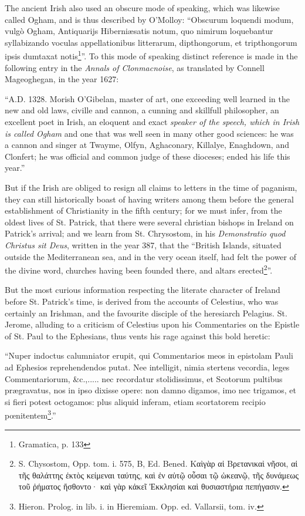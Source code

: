 \documentclass[11pt,oneside]{memoir}
\begin{document}
The ancient Irish also used an obscure mode of speaking, which was likewise called Ogham, and is thus described by O'Molloy: ``Obscurum loquendi modum, vulg\`o \gaelicfont Ogham\normalfont, Antiquarijs Hiberni\ae satis notum, quo nimirum loquebantur syllabizando voculas appellationibus litterarum, dipthongorum, et tripthongorum ipsis dumtaxat notis\footnote{Gramatica, p. 133}''.
To this mode of speaking distinct reference is made in the following entry in the \textit{Annals of Clonmacnoise}, as translated by Connell Mageoghegan, in the year 1627: 

``A.D. 1328. Morish O'Gibelan, master of art, one exceeding well learned in the new  and old laws, civille and cannon, a cunning and skillfull philosopher, an excellent poet in Irish, an eloquent and exact \textit{speaker of the speech, which in Irish is called Ogham} and one that was well seen in many other good sciences: he was a cannon and singer at Twayme, Olfyn, Aghaconary, Killalye, Enaghdown, and Clonfert; he was official and common judge of these dioceses; ended his life this year.''

But if the Irish are obliged to resign all claims to letters in the time of paganism, they can still historically boast of having writers among them before the general establishment of Christianity in the fifth century; for we must infer, from the oldest lives of St. Patrick, that there were several christian bishops in Ireland on Patrick's arrival; and we learn from St. Chrysostom, in his \textit{Demonstratio quod Christus sit Deus}, written in the year 387, that the ``British Islands, situated outside the Mediterranean sea, and in the very ocean itself, had felt the power of the divine word, churches having been founded there, and altars erected\footnote{
    S. Chysostom, Opp. tom. i. 575, B, Ed. Bened. 
    Καὶγὰρ αἱ Βρετανικαὶ νῆσοι, αἱ τῆς θαλάττης ἐκτὸς κείμεναι ταύτης, καὶ ἐν αὐτῷ οὖσαι τῷ ὠκεανῷ, τῆς δυνάμεως τοῦ ῥήματος ἤσθοντο· καὶ γὰρ κἀκεῖ Ἐκκλησίαι καὶ θυσιαστήρια πεπήγασιν.
}''.


But the most curious information respecting the literate character of Ireland before St. Patrick's time, is derived from the accounts of Celestius, who was certainly an Irishman, and the favourite disciple of the heresiarch Pelagius. 
St. Jerome, alluding to a criticism of Celestius upon his Commentaries on the Epistle of St. Paul to the Ephesians, thus vents his rage against this bold heretic: 


``Nuper indoctus calumniator erupit, qui Commentarios meos in epistolam Pauli ad Ephesios reprehendendos putat.
Nee intelligit, nimia stertens vecordia, leges Commentariorum, \&c.,..... nec recordatur stolidissimus, et Scotorum pultibus  %
pr{\ae}gravatus, nos in ipso dixisse opere: non damno digamos, imo nec trigamos, et si fieri potest octogamos: plus aliquid inferam, etiam scortatorem recipio p{\oe}nitentem\footnote{
    Hieron. Prolog. in lib. i. in Hieremiam. Opp. ed. Vallarsii, tom. iv.
}.'' 
\end{document}
